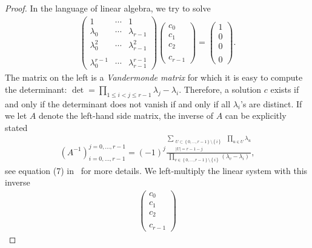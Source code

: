 \begin{proof}
    In the language of linear algebra, we try to solve
    \begin{align*}
        \begin{pmatrix}
            1 & \cdots & 1 \\
            \lambda_0 & \cdots & \lambda_{r-1} \\
            \lambda_0^2 & \cdots & \lambda_{r-1}^2 \\
            & & \\
            \lambda_0^{r-1} & \cdots & \lambda_{r-1}^{r-1}
        \end{pmatrix}
        \begin{pmatrix}
            c_0 \\ c_1 \\ c_2 \\ \\ c_{r-1}
        \end{pmatrix}
        = 
        \begin{pmatrix}
            1 \\ 0 \\ 0 \\ \\ 0
        \end{pmatrix}.
    \end{align*}
    The matrix on the left is a \emph{Vandermonde matrix} for which it is easy to compute the determinant: \(\det = \prod_{1 \leq i < j \leq r - 1} \lambda_j  - \lambda_i\). Therefore, a solution \(c\) exists if and only if the determinant does not vanish if and only if all \(\lambda_i\)'s are distinct. If we let \(A\) denote the left-hand side matrix, the inverse of \(A\)  can be explicitly stated 
    \begin{align*}
        (A^{-1})_{i=0,\ldots,r-1}^{j=0,\ldots,r-1} = (-1)^j \frac{\sum\limits_{\substack{U \subset \left\{ 0,\ldots,r-1 \right\} \setminus \left\{ i \right\} \\ |U| = r - 1 -j}} \; \prod\limits_{u \in U} \lambda_u}{\prod\limits_{v \in \left\{ 0,\ldots,r-1 \right\} \setminus \left\{ i \right\}} (\lambda_v - \lambda_i)},
    \end{align*}
    see equation (7) in~\cite{klinger1965vandermonde} for more details. We left-multiply the linear system with this inverse
    \begin{align*}
        \begin{pmatrix}
            c_0 \\ c_1 \\ c_2 \\ \\ c_{r-1}

\end{pmatrix}
\end{align*}
\end{proof}
